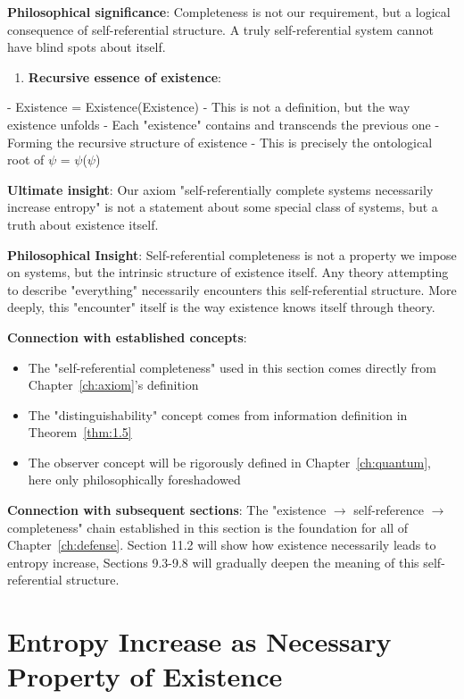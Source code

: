    \textbf{Philosophical significance}: Completeness is not our requirement,
   but a logical consequence of self-referential structure.
   A truly self-referential system cannot have blind spots about itself.

\begin{enumerate}
\item \textbf{Recursive essence of existence}:
\end{enumerate}
   - Existence = Existence(Existence)
   - This is not a definition, but the way existence unfolds
   - Each "existence" contains and transcends the previous one
   - Forming the recursive structure of existence
   - This is precisely the ontological root of $\psi$ = $\psi$($\psi$)
   
   \textbf{Ultimate insight}: Our axiom "self-referentially complete systems necessarily increase entropy"
   is not a statement about some special class of systems,
   but a truth about existence itself.

\textbf{Philosophical Insight}:
Self-referential completeness is not a property we impose on systems, but the intrinsic structure of existence itself.
Any theory attempting to describe "everything" necessarily encounters this self-referential structure.
More deeply, this "encounter" itself is the way existence knows itself through theory.

\textbf{Connection with established concepts}:
\begin{itemize}
\item The "self-referential completeness" used in this section comes directly from Chapter~\ref{ch:axiom}'s definition
\item The "distinguishability" concept comes from information definition in Theorem~\ref{thm:1.5}
\item The observer concept will be rigorously defined in Chapter~\ref{ch:quantum}, here only philosophically foreshadowed
\end{itemize}

\textbf{Connection with subsequent sections}:
The "existence $\rightarrow$ self-reference $\rightarrow$ completeness" chain established in this section is the foundation for all of Chapter~\ref{ch:defense}.
Section 11.2 will show how existence necessarily leads to entropy increase,
Sections 9.3-9.8 will gradually deepen the meaning of this self-referential structure.

\section{Entropy Increase as Necessary Property of Existence}
\label{sec:ch11_philosophy:entropy-increase-as-necessary-property-of-existence}

